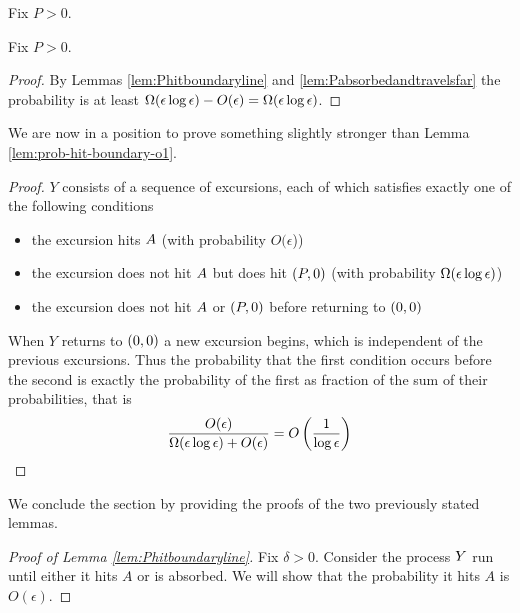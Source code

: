 {\begin{lemma}
  \label{lem:Pabsorbedandtravelsfar}
  Fix $P > 0$. 
\end{lemma}

\begin{lemma*}
  Fix $P > 0$.  
\end{lemma*}

\begin{proof}
  By Lemmas \ref{lem:Phitboundaryline} and
  \ref{lem:Pabsorbedandtravelsfar} the probability is at least
  $\Omega(\epsilon\log\epsilon) - O(\epsilon) = \Omega(\epsilon\log\epsilon)$.
\end{proof}

We are now in a position to prove something slightly stronger than
Lemma \ref{lem:prob-hit-boundary-o1}.

\begin{lemma*}
\end{lemma*}

\newcommand{\Oe}{O(\epsilon)}

\begin{proof}
  $Y$ consists of a sequence of excursions, each of which satisfies
  exactly one of the following conditions
  \begin{itemize}
  \item the excursion hits $A$ (with probability
    $O(\epsilon$))
  \item the excursion does not hit $A$ but does hit
    $(P,0)$ (with probability $\Omega(\epsilon\log\epsilon)$)
  \item the excursion does not hit $A$ or $(P,0)$ before
    returning to $(0,0)$
  \end{itemize}
  When $Y$ returns to $(0,0)$ a new excursion begins, which is independent of
  the previous excursions.  Thus the probability that the first
  condition occurs before the second is exactly the probability of the
  first as fraction of the sum of their probabilities, that is
  \[
  \frac{\Oe}{\Omegaeloge + \Oe} = O\left(\frac{1}{\log\epsilon}\right)
  \]
\end{proof}

We conclude the section by providing the proofs of the two previously
stated lemmas.

\begin{proof}[Proof of Lemma \ref{lem:Phitboundaryline}]
Fix $\delta > 0$.  Consider the process $Y$ run until either
it hits $A$ or is absorbed.  We will show that the probability it
hits $A$ is $O(\epsilon)$.


\end{proof}}
